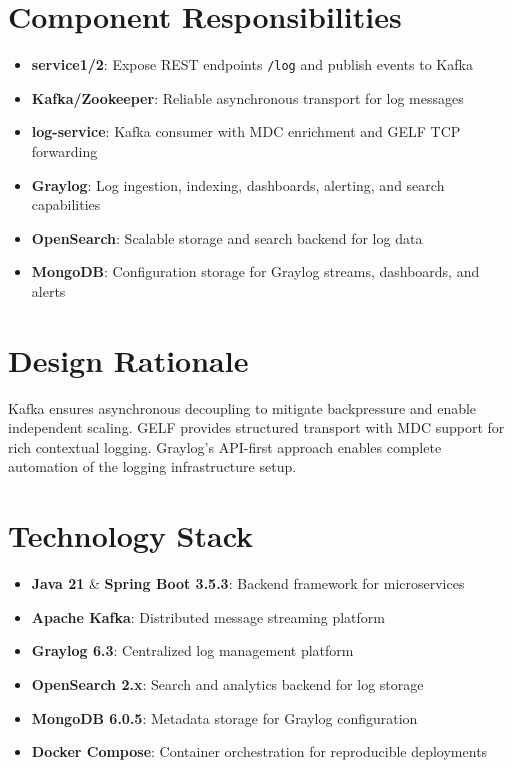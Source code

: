 \documentclass[12pt,a4paper]{report}
\begin{document}
\section{Component Responsibilities}
\begin{itemize}[leftmargin=1.2cm]
  \item \textbf{service1/2}: Expose REST endpoints \texttt{/log} and publish events to Kafka
  \item \textbf{Kafka/Zookeeper}: Reliable asynchronous transport for log messages
  \item \textbf{log-service}: Kafka consumer with MDC enrichment and GELF TCP forwarding
  \item \textbf{Graylog}: Log ingestion, indexing, dashboards, alerting, and search capabilities
  \item \textbf{OpenSearch}: Scalable storage and search backend for log data
  \item \textbf{MongoDB}: Configuration storage for Graylog streams, dashboards, and alerts
\end{itemize}

\section{Design Rationale}
Kafka ensures asynchronous decoupling to mitigate backpressure and enable independent scaling. GELF provides structured transport with MDC support for rich contextual logging. Graylog's API-first approach enables complete automation of the logging infrastructure setup.

\section{Technology Stack}
\begin{itemize}[leftmargin=1.2cm]
  \item \textbf{Java 21} \& \textbf{Spring Boot 3.5.3}: Backend framework for microservices
  \item \textbf{Apache Kafka}: Distributed message streaming platform
  \item \textbf{Graylog 6.3}: Centralized log management platform
  \item \textbf{OpenSearch 2.x}: Search and analytics backend for log storage
  \item \textbf{MongoDB 6.0.5}: Metadata storage for Graylog configuration
  \item \textbf{Docker Compose}: Container orchestration for reproducible deployments
\end{itemize}
\end{document}
